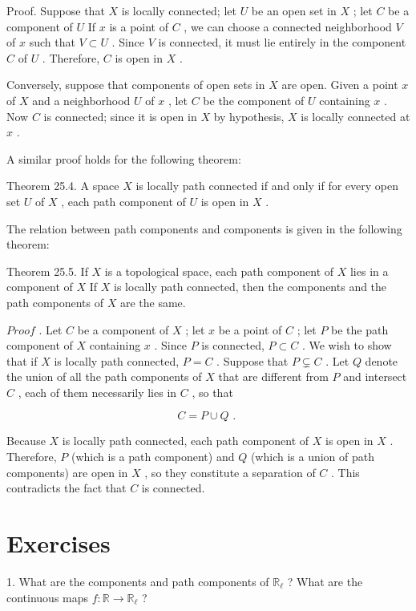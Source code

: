 Proof. Suppose that \(X\) is locally connected; let \(U\) be an open set in \(X\) ; let \(C\) be a component of \(U\) If \(x\) is a point of \(C\) , we can choose a connected neighborhood \(V\) of \(x\) such that \(V \subset  U\) . Since \(V\) is connected, it must lie entirely in the component \(C\) of \(U\) . Therefore, \(C\) is open in \(X\) .

Conversely, suppose that components of open sets in \(X\) are open. Given a point \(x\) of \(X\) and a neighborhood \(U\) of \(x\) , let \(C\) be the component of \(U\) containing \(x\) . Now \(C\) is connected; since it is open in \(X\) by hypothesis, \(X\) is locally connected at \(x\) .

A similar proof holds for the following theorem:

Theorem 25.4. A space \(X\) is locally path connected if and only if for every open set \(U\) of \(X\) , each path component of \(U\) is open in \(X\) .

The relation between path components and components is given in the following theorem:

Theorem 25.5. If \(X\) is a topological space, each path component of \(X\) lies in a component of \(X\) If \(X\) is locally path connected, then the components and the path components of \(X\) are the same.

\({Proof}\) . Let \(C\) be a component of \(X\) ; let \(x\) be a point of \(C\) ; let \(P\) be the path component of \(X\) containing \(x\) . Since \(P\) is connected, \(P \subset  C\) . We wish to show that if \(X\) is locally path connected, \(P = C\) . Suppose that \(P \subsetneq  C\) . Let \(Q\) denote the union of all the path components of \(X\) that are different from \(P\) and intersect \(C\) , each of them necessarily lies in \(C\) , so that

\[
C = P \cup  Q\text{ . }
\]

Because \(X\) is locally path connected, each path component of \(X\) is open in \(X\) . Therefore, \(P\) (which is a path component) and \(Q\) (which is a union of path components) are open in \(X\) , so they constitute a separation of \(C\) . This contradicts the fact that \(C\) is connected.

\section*{Exercises}

1. What are the components and path components of \({\mathbb{R}}_{\ell }\) ? What are the continuous maps \(f : \mathbb{R} \rightarrow  {\mathbb{R}}_{\ell }\) ?

